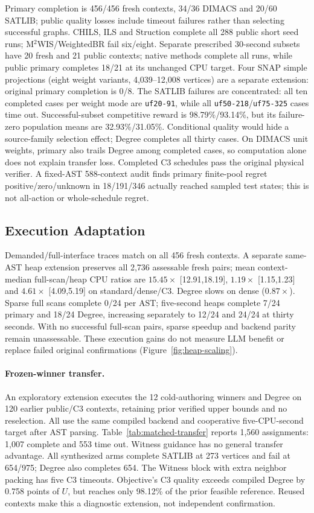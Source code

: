 Primary completion is 456/456 fresh contexts, 34/36 DIMACS and 20/60 SATLIB;
public quality losses include timeout failures rather than selecting successful
graphs. CHILS, ILS and Struction complete all 288 public short seed runs;
M$^2$WIS/WeightedBR fail six/eight. Separate prescribed 30-second subsets
have 20 fresh and 21 public contexts; native methods complete all runs,
while public primary completes 18/21 at its unchanged CPU target.
Four SNAP simple projections (eight weight variants, 4,039--12,008 vertices)
are a separate extension: original primary completion is 0/8.
The SATLIB failures are concentrated: all ten completed cases per weight
mode are \texttt{uf20-91}, while all \texttt{uf50-218}/\texttt{uf75-325}
cases time out. Successful-subset competitive reward is 98.79\%/93.14\%,
but its failure-zero population means are 32.93\%/31.05\%. Conditional
quality would hide a source-family selection effect; Degree completes all
thirty cases. On DIMACS unit weights, primary also trails Degree among
completed cases, so computation alone does not explain transfer loss.
Completed C3 schedules pass the original physical verifier. A fixed-AST
588-context audit finds primary finite-pool regret positive/zero/unknown in
18/191/346 actually reached sampled test states; this is not all-action or
whole-schedule regret.

\subsection{Execution Adaptation}
\label{sec:experiments:deployment}
Demanded/full-interface traces match on all 456 fresh contexts. A separate
same-AST heap extension preserves all 2,736 assessable fresh pairs;
mean context-median full-scan/heap CPU ratios
are $15.45\times$ [12.91,18.19], $1.19\times$ [1.15,1.23] and
$4.61\times$ [4.09,5.19] on standard/dense/C3. Degree slows on dense
($0.87\times$). Sparse full scans complete 0/24 per AST; five-second heaps
complete 7/24 primary and 18/24 Degree, increasing separately to 12/24 and
24/24 at thirty seconds. With no successful full-scan pairs, sparse speedup
and backend parity remain unassessable. These execution gains do not measure
LLM benefit or replace failed original confirmations (Figure~\ref{fig:heap-scaling}).

\paragraph{Frozen-winner transfer.}
An exploratory extension executes the 12 cold-authoring winners and Degree
on 120 earlier public/C3 contexts, retaining prior verified upper bounds
and no reselection. All use the same compiled backend and cooperative
five-CPU-second target after AST parsing. Table~\ref{tab:matched-transfer}
reports 1,560 assignments: 1,007 complete and 553 time out.
Witness guidance has no general transfer advantage. All synthesized arms
complete SATLIB at 273 vertices and fail at 654/975; Degree also completes
654. The Witness block with extra neighbor packing has five C3 timeouts.
Objective's C3 quality exceeds compiled Degree by 0.758 points of $U$,
but reaches only 98.12\% of the prior feasible reference. Reused contexts
make this a diagnostic extension, not independent confirmation.
